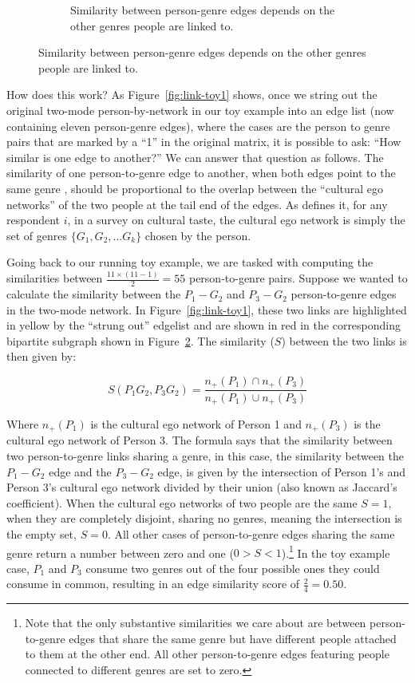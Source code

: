 \documentclass[a4paper,12pt]{extarticle}
\begin{document}
\begin{figure}[t!]
\begin{subfigure}[b]{0.3\textwidth}
        \caption{Similarity between person-genre edges depends on the other genres people are linked to.}
        \label{fig:link-toy2}
    \end{subfigure}
\end{figure}
 
How does this work? As Figure~\ref{fig:link-toy1} shows, once we string out the original two-mode person-by-network in our toy example into an edge list (now containing eleven person-genre edges), where the cases are the person to genre pairs that are marked by a ``1'' in the original matrix, it is possible to ask: ``How similar is one edge to another?'' We can answer that question as follows. The similarity of one person-to-genre edge to another, when both edges point to the same genre \citep{ahn_etal10}, should be proportional to the overlap between the ``cultural ego networks'' of the two people at the tail end of the edges. As \citet{lizardo14} defines it, for any respondent $i$, in a survey on cultural taste, the cultural ego network is simply the set of genres $\{G_1, G_2,\dots G_k\}$ chosen by the person. 

Going back to our running toy example, we are tasked with computing the similarities between $\frac{11 \times (11-1)}{2} = 55$ person-to-genre pairs. Suppose we wanted to calculate the similarity between the $P_1-G_2$ and $P_3-G_2$ person-to-genre edges in the two-mode network. In Figure~\ref{fig:link-toy1}, these two links are highlighted in yellow by the ``strung out'' edgelist and are shown in red in the corresponding bipartite subgraph shown in Figure~\ref{fig:link-toy2}. The similarity ($S$) between the two links is then given by:

\begin{equation}
    S(P_1G_2, P_3G_2) = \frac{n_+(P_1) \cap n_+(P_3)}{n_+(P_1) \cup n_+(P_3)}
\end{equation}

Where $n_+(P_1)$ is the cultural ego network of Person 1 and $n_+(P_3)$ is the cultural ego network of Person 3. The formula says that the similarity between two person-to-genre links sharing a genre, in this case, the similarity between the $P_1-G_2$ edge and the $P_3-G_2$ edge, is given by the intersection of Person 1's and Person 3's cultural ego network divided by their union (also known as Jaccard's coefficient). When the cultural ego networks of two people are the same $S=1$, when they are completely disjoint, sharing no genres, meaning the intersection is the empty set,  $S = 0$. All other cases of person-to-genre edges sharing the same genre return a number between zero and one ($0 > S < 1$).\footnote{Note that the only substantive similarities we care about are between person-to-genre edges that share the same genre but have different people attached to them at the other end. All other person-to-genre edges featuring people connected to different genres are set to zero.} In the toy example case, $P_1$ and $P_3$ consume two genres out of the four possible ones they could consume in common, resulting in an edge similarity score of $\frac{2}{4} = 0.50$. 
\end{document}
